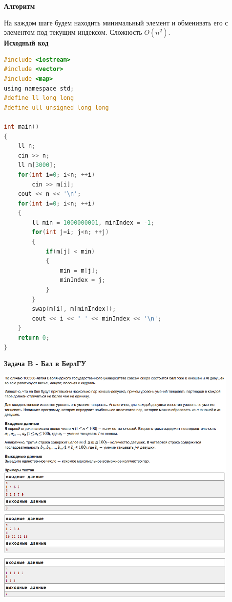 \documentclass[a4paper,12pt]{article}
\begin{document}
\newpage
\textbf{{\large Алгоритм}}

На каждом шаге будем находить минимальный элемент и обменивать его с элементом под текущим индексом. Сложность $O(n^2)$. \\

\textbf{{\large Исходный код}} \\
\begin{lstlisting}[language=C]
#include <iostream>
#include <vector>
#include <map>
using namespace std;
#define ll long long
#define ull unsigned long long

int main()
{
    ll n;
    cin >> n;
    ll m[3000];
    for(int i=0; i<n; ++i)
        cin >> m[i];
    cout << n << '\n';
    for(int i=0; i<n; ++i)
    {
        ll min = 1000000001, minIndex = -1;
        for(int j=i; j<n; ++j)
        {
            if(m[j] < min)
            {
                min = m[j];
                minIndex = j;
            }
        }
        swap(m[i], m[minIndex]);
        cout << i << ' ' << minIndex << '\n';
    }
    return 0;
}
\end{lstlisting}

\newpage
\textbf{{\large Задача B - Бал в БерлГУ}} \\
\begin{center}
\includegraphics[width=0.9\textwidth]{C_277_5/C_277_5_B1.png}\\
\includegraphics[width=0.9\textwidth]{C_277_5/C_277_5_B2.png}\\ [1cm]
\end{center}
\end{document}
